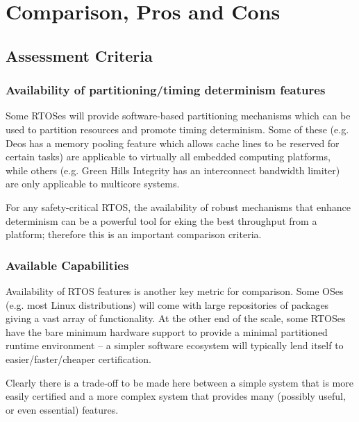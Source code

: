 \section{Comparison, Pros and Cons}
\label{comparison-pros-and-cons}

\subsection{Assessment Criteria}

\subsubsection{Availability of partitioning/timing determinism features}

Some RTOSes will provide software-based partitioning mechanisms which can be used to partition resources and promote timing determinism. Some of these (e.g. Deos has a memory pooling feature which allows cache lines to be reserved for certain tasks) are applicable to virtually all embedded computing platforms, while others (e.g. Green Hills Integrity has an interconnect bandwidth limiter) are only applicable to multicore systems.

For any safety-critical RTOS, the availability of robust mechanisms that enhance determinism can be a powerful tool for eking the best throughput from a platform; therefore this is an important comparison criteria.

\subsubsection{Available Capabilities}

Availability of RTOS features is another key metric for comparison. Some OSes (e.g. most Linux distributions) will come with large repositories of packages giving a vast array of functionality. At the other end of the scale, some RTOSes have the bare minimum hardware support to provide a minimal partitioned runtime environment -- a simpler software ecosystem will typically lend itself to easier/faster/cheaper certification.

Clearly there is a trade-off to be made here between a simple system that is more easily certified and a more complex system that provides many (possibly useful, or even essential) features.

